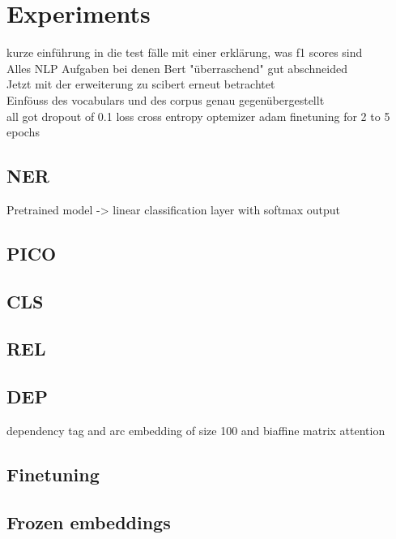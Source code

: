 \chapter{Experiments}
kurze einführung in die test fälle mit einer erklärung, was f1 scores sind\\
Alles NLP Aufgaben bei denen Bert "überraschend" gut abschneided\\
Jetzt mit der erweiterung zu scibert erneut betrachtet\\
Einföuss des vocabulars und des corpus genau gegenübergestellt\\

all got dropout of 0.1
loss cross entropy
optemizer adam
finetuning for 2 to 5 epochs 
\section{NER}
Pretrained model -> linear classification layer with softmax output
\section{PICO}
\section{CLS}
\section{REL}
\section{DEP}
dependency  tag and arc embedding of size 100 and biaffine matrix attention 
\section{Finetuning}
\section{Frozen embeddings}

